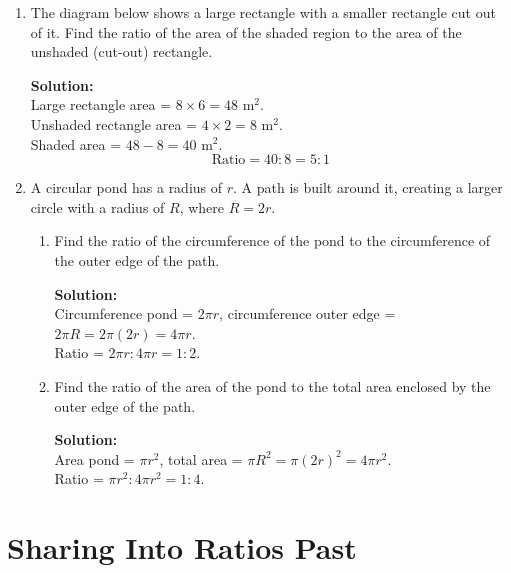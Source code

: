 \documentclass[12pt,a4paper]{article}
\begin{document}
\begin{enumerate}
\begin{enumerate}
    \textbf{Solution:}\\
    Area ratio = \( 1^2 : \left(\frac{3}{2}\right)^2 = 1 : \frac{9}{4} = 4:9 \).
    \end{enumerate}

\item The diagram below shows a large rectangle with a smaller rectangle cut out of it. Find the ratio of the area of the shaded region to the area of the unshaded (cut-out) rectangle.

\textbf{Solution:}\\
Large rectangle area = \( 8 \times 6 = 48 \text{ m}^2 \).\\
Unshaded rectangle area = \( 4 \times 2 = 8 \text{ m}^2 \).\\
Shaded area = \( 48 - 8 = 40 \text{ m}^2 \).\\
\[
\text{Ratio} = 40:8 = 5:1
\]

\item A circular pond has a radius of \( r \). A path is built around it, creating a larger circle with a radius of \( R \), where \( R = 2r \).
    \begin{enumerate}
    \item Find the ratio of the circumference of the pond to the circumference of the outer edge of the path.
    
    \textbf{Solution:}\\
    Circumference pond = \( 2\pi r \), circumference outer edge = \( 2\pi R = 2\pi(2r) = 4\pi r \).\\
    Ratio = \( 2\pi r : 4\pi r = 1:2 \).
    
    \item Find the ratio of the area of the pond to the total area enclosed by the outer edge of the path.
    
    \textbf{Solution:}\\
    Area pond = \( \pi r^2 \), total area = \( \pi R^2 = \pi(2r)^2 = 4\pi r^2 \).\\
    Ratio = \( \pi r^2 : 4\pi r^2 = 1:4 \).
    \end{enumerate}

\end{enumerate}

\section*{Sharing Into Ratios Past}
\end{document}
